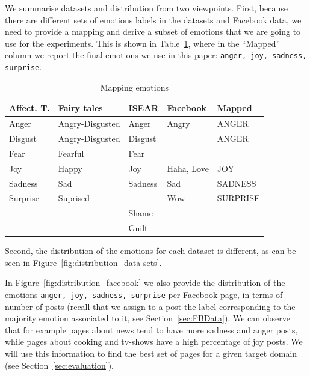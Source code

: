 \documentclass[11pt]{article}
\begin{document}
We summarise datasets and distribution from two viewpoints. First, because there are different sets of emotions labels in the datasets and Facebook data, we need to provide a mapping and derive a subset of emotions that we are going to use for the experiments. This is shown in Table~\ref{overview_data-sets}, where in the ``Mapped'' column we report the final emotions we use in this paper: \texttt{anger, joy, sadness, surprise}. 
\begin{table}
\vspace*{-.5cm}
\begin{footnotesize}
\caption{Mapping emotions\label{overview_data-sets}}
\centering
\begin{tabular}{|l|l|l|l|l|}
\hline
\textbf{Affect. T.} & \textbf{Fairy tales} & \textbf{ISEAR} & \textbf{Facebook} & \textbf{Mapped} \\ \hline
Anger            & Angry-Disgusted      & Anger               & Angry   & ANGER          \\ \hline
Disgust          & Angry-Disgusted      & Disgust               &    &  ANGER              \\ \hline
Fear             & Fearful              & Fear               &      &              \\ \hline
Joy              & Happy                & Joy                & Haha, Love & JOY\\ \hline
Sadness          & Sad                  & Sadness               & Sad     & SADNESS          \\ \hline
Surprise         & Suprised             &                & Wow          & SURPRISE     \\ 
\hline
                 &                      & Shame               &       &         \\ \hline
                 &                      & Guilt               &       &         \\                  
\hline
\end{tabular}
\end{footnotesize}
\end{table}
Second, the distribution of the emotions for each dataset is different, as can be seen in Figure~\ref{fig:distribution_data-sets}. 

In Figure~\ref{fig:distribution_facebook} we also provide the distribution of the emotions \texttt{anger, joy, sadness, surprise} per Facebook page, in terms of number of posts (recall that we assign to a post the label corresponding to the majority emotion associated to it, see Section~\ref{sec:FBData}). We can observe that for example pages about news  tend to have more sadness and anger posts, while pages about cooking and tv-shows have a high percentage of joy posts. We will use this information to find the best set of pages for a given target domain (see Section~\ref{sec:evaluation}).
\end{document}
